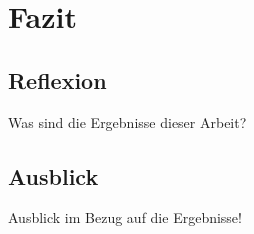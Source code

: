 
\chapter{Fazit}

\section{Reflexion} \label{Kap:Reflexion}
Was sind die Ergebnisse dieser Arbeit?

\section{Ausblick} \label{Kap:Ausblick}
Ausblick im Bezug auf die Ergebnisse!

\newpage


